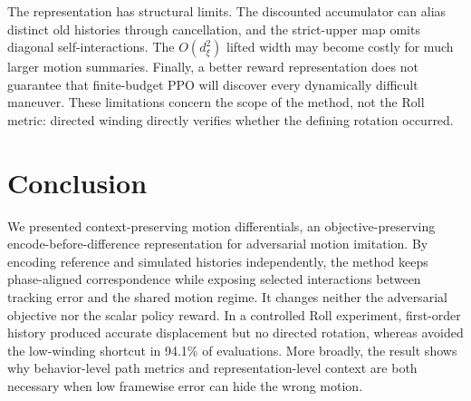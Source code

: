 The representation has structural limits.  The discounted accumulator can
alias distinct old histories through cancellation, and the strict-upper map
omits diagonal self-interactions.  The $O(d_\xi^2)$ lifted width may become costly
for much larger motion summaries.  Finally, a better reward representation
does not guarantee that finite-budget PPO will discover every dynamically
difficult maneuver.  These limitations concern the scope of the method, not
the Roll metric: directed winding directly verifies whether the defining
rotation occurred.

\section{Conclusion}

We presented context-preserving motion differentials, an objective-preserving
encode-before-difference representation for adversarial motion imitation.
By encoding reference and simulated histories independently, the method keeps
phase-aligned correspondence while exposing selected interactions between
tracking error and the shared motion regime.  It changes neither the adversarial
objective nor the scalar policy reward.  In a controlled Roll experiment,
first-order history produced accurate displacement but no directed rotation,
whereas \method{} avoided the low-winding shortcut in 94.1\% of evaluations.
More broadly, the result shows why behavior-level path metrics and
representation-level context
are both necessary when low framewise error can hide the wrong motion.





